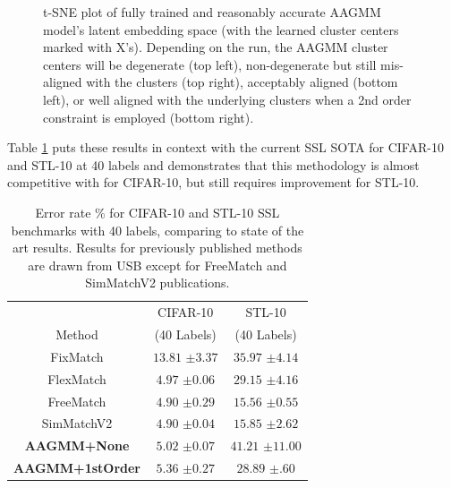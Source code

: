 \documentclass[10pt,twocolumn,letterpaper]{article}
\begin{document}
\begin{figure}[h]
	\caption{t-SNE plot of fully trained and reasonably accurate AAGMM model's latent embedding space (with the learned cluster centers marked with X's). Depending on the run, the AAGMM cluster centers will be degenerate (top left), non-degenerate but still mis-aligned with the clusters (top right), acceptably aligned (bottom left), or well aligned with the underlying clusters when a 2nd order constraint is employed (bottom right).} 
	\label{fig:cifar10tsneaagmmnone}
\end{figure}


Table \ref{sslcifar10} puts these results in context with the current SSL SOTA for CIFAR-10 and STL-10 at 40 labels and demonstrates that this methodology is almost competitive with for CIFAR-10, but still requires improvement for STL-10. 

\begin{table}[htbp]
	\begin{tabular}{c|cc}
		& CIFAR-10  &STL-10 \\ 
		Method & (40 Labels) & (40 Labels) \\
		\hline
		\hline
		FixMatch\cite{sohn2020fixmatch}   & $13.81$ \scriptsize{$\pm3.37$}   & $35.97$ \scriptsize{$\pm4.14$}     \\
		FlexMatch\cite{zhang2021flexmatch}  & $4.97$ \scriptsize{$\pm0.06$}    & $29.15$ \scriptsize{$\pm4.16$}    \\
		FreeMatch\cite{wang2022freematch}  & $4.90$ \scriptsize{$\pm0.29$}    & $15.56$ \scriptsize{$\pm0.55$}    \\
		SimMatchV2\cite{zheng2023simmatchv2} & $4.90$ \scriptsize{$\pm0.04$}    & $15.85$ \scriptsize{$\pm2.62$}    \\ \hline
		\textbf{AAGMM+None}    & $5.02$ \scriptsize{$\pm 0.07$}           & $41.21$ \scriptsize{$\pm11.00$}  \\
		\textbf{AAGMM+1stOrder}   & $5.36$ \scriptsize{$\pm 0.27$}           & $28.89$ \scriptsize{$\pm .60$}  
		
	\end{tabular}
	\caption{Error rate \% for CIFAR-10 and STL-10 SSL benchmarks with 40 labels, comparing to state of the art results. Results for previously published methods are drawn from USB \cite{wang2022usb} except for FreeMatch \cite{wang2022freematch} and SimMatchV2 \cite{zheng2023simmatchv2} publications.}
	\label{sslcifar10}
\end{table}
\end{document}
